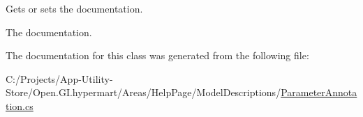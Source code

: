 Gets or sets the documentation. 

The documentation. 

The documentation for this class was generated from the following file\+:\begin{DoxyCompactItemize}
\item 
C\+:/\+Projects/\+App-\/\+Utility-\/\+Store/\+Open.\+G\+I.\+hypermart/\+Areas/\+Help\+Page/\+Model\+Descriptions/\hyperlink{_parameter_annotation_8cs}{Parameter\+Annotation.\+cs}\end{DoxyCompactItemize}
